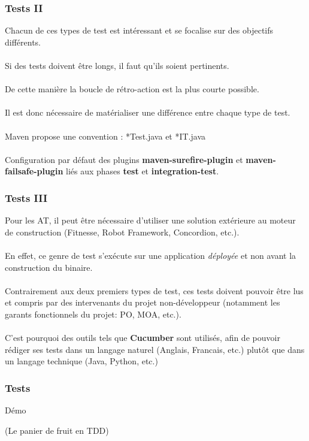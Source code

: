 \begin{frame}
	\frametitle{Tests II}
    Chacun de ces types de test est int\'{e}ressant et se focalise sur des objectifs diff\'{e}rents.
    \\~\\
    Si des tests doivent \^{e}tre longs, il faut qu'ils soient pertinents.
    \\~\\
    De cette mani\`{e}re la boucle de r\'{e}tro-action est la plus courte possible.
    \\~\\
    Il est donc n\'{e}cessaire de mat\'{e}rialiser une diff\'{e}rence entre chaque type de test.
	\\~\\
	Maven propose une convention : *Test.java et *IT.java
    \\~\\
    Configuration par d\'{e}faut des plugins \textbf{maven-surefire-plugin} et \textbf{maven-failsafe-plugin} li\'{e}s aux phases \textbf{test} et \textbf{integration-test}.
\end{frame}

\begin{frame}
	\frametitle{Tests III}
    Pour les AT, il peut \^{e}tre n\'{e}cessaire d'utiliser une solution ext\'{e}rieure au moteur de construction (Fitnesse, Robot Framework, Concordion, etc.).
    \\~\\
    En effet, ce genre de test s'ex\'{e}cute sur une application \textit{d\'{e}ploy\'{e}e} et non avant la construction du binaire.
    \\~\\
    Contrairement aux deux premiers types de test, ces tests doivent pouvoir \^{e}tre lus et compris par des intervenants du projet non-d\'{e}veloppeur (notamment les garants fonctionnels du projet: PO, MOA, etc.).
    \\~\\
    C'est pourquoi des outils tels que \textbf{Cucumber} sont utilis\'{e}s, afin de pouvoir r\'{e}diger ses tests dans un langage naturel (Anglais, Francais, etc.) plut\^{o}t que dans un langage technique (Java, Python, etc.)
\end{frame}

\begin{frame}
	\frametitle{Tests}
    \begin{center}
    \fontsize{48pt}{7.2}\selectfont
    D\'{e}mo
    \end{center}
    \begin{center}
    (Le panier de fruit en TDD)
    \end{center}
\end{frame}

